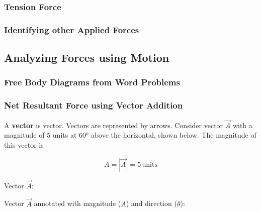 \documentclass[dvipsnames]{article}
\begin{document}
\subsubsection{Tension Force}

\subsubsection{Identifying other Applied Forces}

\subsection{Analyzing Forces using Motion}

\subsubsection{Free Body Diagrams from Word Problems}

\subsubsection{Net Resultant Force using Vector Addition}

A \textbf{\gls{vector}} is \glsdesc{vector}. Vectors are represented by arrows. Consider vector $\vec{A}$ with a magnitude of 5 units at \ang{60} above the horizontal, shown below. The magnitude of this vector is

\begin{equation*}
    A = \left|\vec{A}\right| = 5\,\mathrm{units}
\end{equation*}

\begin{center}
\begin{minipage}{0.3\textwidth}
\centering

Vector $\vec{A}$:

\bigskip

\end{minipage}%
\begin{minipage}{0.65\textwidth}
\centering

Vector $\vec{A}$ annotated with magnitude ($A$) and direction ($\theta$):

\bigskip

\end{minipage}
\end{center}
\end{document}
